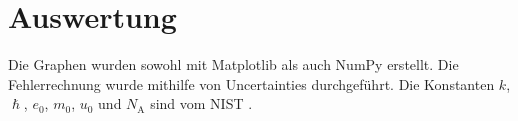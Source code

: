 \section{Auswertung}
\label{sec:Auswertung}


Die Graphen wurden sowohl mit Matplotlib \cite{matplotlib} als auch NumPy \cite{numpy} erstellt. Die
Fehlerrechnung wurde mithilfe von Uncertainties \cite{uncertainties} durchgeführt.
Die Konstanten $k$, $\hslash$, $e_0$, $m_0$, $u_0$ und $N_\text{A}$ sind vom NIST \cite{nistgov}.